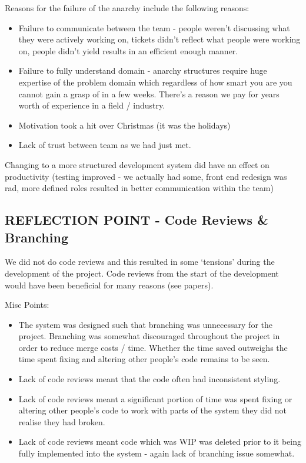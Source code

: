 \documentclass{l3proj}
\begin{document}
Reasons for the failure of the anarchy include the following reasons:

\begin{itemize}
\item Failure to communicate between the team - people weren’t discussing what they were actively working on, tickets didn’t reflect what people were working on, people didn’t yield results in an efficient enough manner.
\item Failure to fully understand domain - anarchy structures require huge expertise of the problem domain which regardless of how smart you are you cannot gain a grasp of in a few weeks. There’s a reason we pay for years worth of experience in a field / industry.
\item Motivation took a hit over Christmas (it was the holidays)
\item Lack of trust between team as we had just met.
\end{itemize}

Changing to a more structured development system did have an effect on productivity (testing improved - we actually had some, front end redesign was rad, more defined roles resulted in better communication within the team)


\subsection{REFLECTION POINT - Code Reviews \& Branching}
\label{codereviewbranch}
We did not do code reviews and this resulted in some ‘tensions’ during the development of the project. Code reviews from the start of the development would have been beneficial for many reasons (see papers).

Misc Points:
\begin{itemize}
\item The system was designed such that branching was unnecessary for the project. Branching was somewhat discouraged throughout the project in order to reduce merge costs / time. Whether the time saved outweighs the time spent fixing and altering other people’s code remains to be seen.
\item Lack of code reviews meant that the code often had inconsistent styling.
\item Lack of code reviews meant a significant portion of time was spent fixing or altering other people's code to work with parts of the system they did not realise they had broken.
\item Lack of code reviews meant code which was WIP was deleted prior to it being fully implemented into the system - again lack of branching issue somewhat.
\end{itemize}
\end{document}
